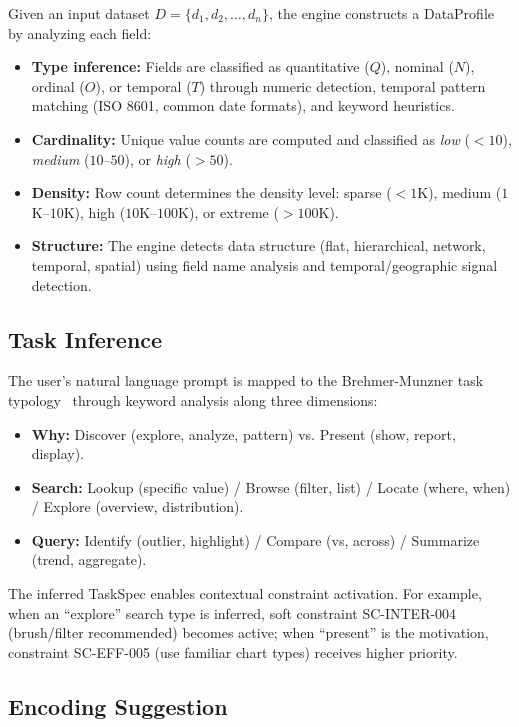 \documentclass[journal]{vgtc}
\begin{document}
Given an input dataset $D = \{d_1, d_2, \ldots, d_n\}$, the engine constructs a DataProfile by analyzing each field:

\begin{itemize}
\item \textbf{Type inference:} Fields are classified as quantitative ($Q$), nominal ($N$), ordinal ($O$), or temporal ($T$) through numeric detection, temporal pattern matching (ISO 8601, common date formats), and keyword heuristics.
\item \textbf{Cardinality:} Unique value counts are computed and classified as \textit{low} ($<10$), \textit{medium} ($10$--$50$), or \textit{high} ($>50$).
\item \textbf{Density:} Row count determines the density level: sparse ($<1$K), medium ($1$K--$10$K), high ($10$K--$100$K), or extreme ($>100$K).
\item \textbf{Structure:} The engine detects data structure (flat, hierarchical, network, temporal, spatial) using field name analysis and temporal/geographic signal detection.
\end{itemize}

\subsection{Task Inference}

The user's natural language prompt is mapped to the Brehmer-Munzner task typology~\cite{brehmer2013multi} through keyword analysis along three dimensions:

\begin{itemize}
\item \textbf{Why:} Discover (explore, analyze, pattern) vs. Present (show, report, display).
\item \textbf{Search:} Lookup (specific value) / Browse (filter, list) / Locate (where, when) / Explore (overview, distribution).
\item \textbf{Query:} Identify (outlier, highlight) / Compare (vs, across) / Summarize (trend, aggregate).
\end{itemize}

The inferred TaskSpec enables contextual constraint activation.
For example, when an ``explore'' search type is inferred, soft constraint SC-INTER-004 (brush/filter recommended) becomes active;
when ``present'' is the motivation, constraint SC-EFF-005 (use familiar chart types) receives higher priority.

\subsection{Encoding Suggestion}
\end{document}
